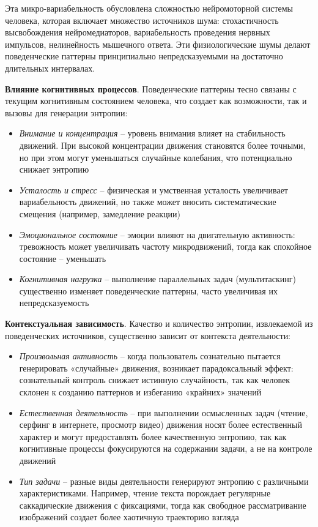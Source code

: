 \documentclass[14pt, a4paper]{extreport}
\begin{document}
Эта микро-вариабельность обусловлена сложностью нейромоторной системы человека, которая включает множество источников шума: стохастичность высвобождения нейромедиаторов, вариабельность проведения нервных импульсов, нелинейность мышечного ответа. Эти физиологические шумы делают поведенческие паттерны принципиально непредсказуемыми на достаточно длительных интервалах.

\textbf{Влияние когнитивных процессов}. Поведенческие паттерны тесно связаны с текущим когнитивным состоянием человека, что создает как возможности, так и вызовы для генерации энтропии:
\begin{itemize}
    \item \textit{Внимание и концентрация} -- уровень внимания влияет на стабильность движений. При высокой концентрации движения становятся более точными, но при этом могут уменьшаться случайные колебания, что потенциально снижает энтропию
    \item \textit{Усталость и стресс} -- физическая и умственная усталость увеличивает вариабельность движений, но также может вносить систематические смещения (например, замедление реакции)
    \item \textit{Эмоциональное состояние} -- эмоции влияют на двигательную активность: тревожность может увеличивать частоту микродвижений, тогда как спокойное состояние -- уменьшать
    \item \textit{Когнитивная нагрузка} -- выполнение параллельных задач (мультитаскинг) существенно изменяет поведенческие паттерны, часто увеличивая их непредсказуемость
\end{itemize}

\textbf{Контекстуальная зависимость}. Качество и количество энтропии, извлекаемой из поведенческих источников, существенно зависит от контекста деятельности:
\begin{itemize}
    \item \textit{Произвольная активность} -- когда пользователь сознательно пытается генерировать «случайные» движения, возникает парадоксальный эффект: сознательный контроль снижает истинную случайность, так как человек склонен к созданию паттернов и избеганию «крайних» значений
    \item \textit{Естественная деятельность} -- при выполнении осмысленных задач (чтение, серфинг в интернете, просмотр видео) движения носят более естественный характер и могут предоставлять более качественную энтропию, так как когнитивные процессы фокусируются на содержании задачи, а не на контроле движений
    \item \textit{Тип задачи} -- разные виды деятельности генерируют энтропию с различными характеристиками. Например, чтение текста порождает регулярные саккадические движения с фиксациями, тогда как свободное рассматривание изображений создает более хаотичную траекторию взгляда
\end{itemize}
\end{document}
